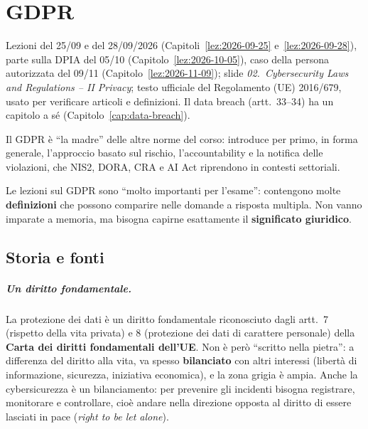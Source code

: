 \chapter{GDPR}
\label{cap:gdpr}

\begin{nota}[Fonti]
Lezioni del 25/09 e del 28/09/2026 (Capitoli~\ref{lez:2026-09-25} e~\ref{lez:2026-09-28}), parte
sulla DPIA del 05/10 (Capitolo~\ref{lez:2026-10-05}), caso della persona autorizzata del 09/11
(Capitolo~\ref{lez:2026-11-09}); slide \emph{02.~Cybersecurity Laws and Regulations -- II Privacy};
testo ufficiale del Regolamento (UE) 2016/679, usato per verificare articoli e definizioni. Il data
breach (artt.~33--34) ha un capitolo a sé (Capitolo~\ref{cap:data-breach}).
\end{nota}

Il GDPR è ``la madre'' delle altre norme del corso: introduce per primo, in forma generale, l'approccio
basato sul rischio, l'accountability e la notifica delle violazioni, che NIS2, DORA, CRA e AI Act
riprendono in contesti settoriali.

\begin{esame}
Le lezioni sul GDPR sono ``molto importanti per l'esame'': contengono molte \textbf{definizioni} che
possono comparire nelle domande a risposta multipla. Non vanno imparate a memoria, ma bisogna capirne
esattamente il \textbf{significato giuridico}.
\end{esame}

\section{Storia e fonti}
\label{sec:gdpr-storia}

\paragraph{Un diritto fondamentale.} La protezione dei dati è un diritto fondamentale riconosciuto dagli
artt.~7 (rispetto della vita privata) e 8 (protezione dei dati di carattere personale) della
\textbf{Carta dei diritti fondamentali dell'UE}. Non è però ``scritto nella pietra'': a differenza del
diritto alla vita, va spesso \textbf{bilanciato} con altri interessi (libertà di informazione, sicurezza,
iniziativa economica), e la zona grigia è ampia. Anche la cybersicurezza è un bilanciamento: per
prevenire gli incidenti bisogna registrare, monitorare e controllare, cioè andare nella direzione opposta
al diritto di essere lasciati in pace (\emph{right to be let alone}).

